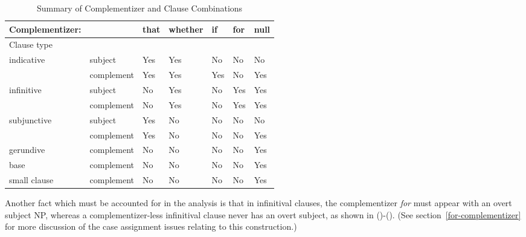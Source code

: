 

\begin{table}[ht]
\centering
\begin{tabular}{|l|llllll|} \hline
Complementizer:&&that&whether&if&for&null\\
\hline
Clause type&&&&&&\\
\hline
indicative&subject&Yes&Yes&No&No&No\\
&complement&Yes&Yes&Yes&No&Yes\\
\hline
infinitive&subject&No&Yes&No&Yes&Yes\\
&complement&No&Yes&No&Yes&Yes\\
\hline
subjunctive&subject&Yes&No&No&No&No\\
&complement&Yes&No&No&No&Yes\\
\hline
gerundive\footnotemark\ &complement&No&No&No&No&Yes\\
\hline
base & complement & No & No & No & No & Yes \\
\hline
small clause & complement & No & No & No & No & Yes \\
\hline
\end{tabular}
\vspace{.2in}
\caption{Summary of Complementizer and Clause Combinations}
\label{facts}
\end{table}


Another fact which must be accounted for in the analysis is that in infinitival
clauses, the complementizer {\it for} must appear with an overt subject NP,
whereas a complementizer-less infinitival clause never has an overt subject, as
shown in ()-(). (See section~\ref{for-complementizer} for more
discussion of the case assignment issues relating to this construction.)



